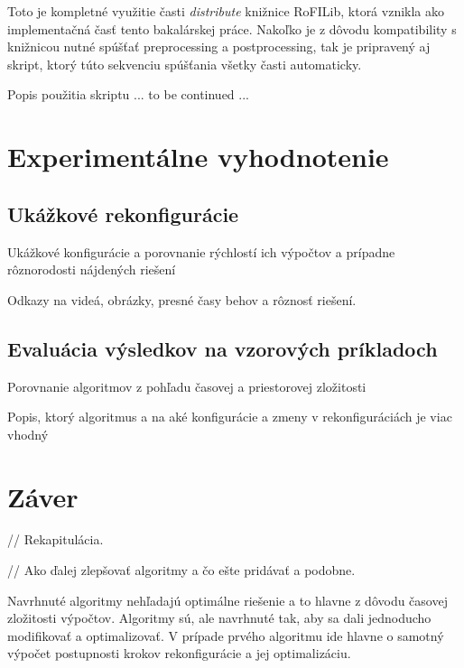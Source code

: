 \documentclass[
  digital, %
  oneside, %
  table,   %
  lof,     %
  nolot,     %
]{fithesis3}
\begin{document}
Toto je kompletné využitie časti \textit{distribute} knižnice RoFILib, ktorá vznikla ako implementačná časť tento bakalárskej práce. Nakoľko je z dôvodu kompatibility s knižnicou nutné spúšťať preprocessing a postprocessing, tak je pripravený aj skript, ktorý túto sekvenciu spúšťania všetky časti automaticky. 

Popis použitia skriptu ... to be continued ...










\chapter{Experimentálne vyhodnotenie}
\section{Ukážkové rekonfigurácie}
Ukážkové konfigurácie a porovnanie rýchlostí ich výpočtov a prípadne rôznorodosti nájdených riešení

Odkazy na videá, obrázky, presné časy behov a rôznosť riešení. 
\section{Evaluácia výsledkov na vzorových príkladoch}
Porovnanie algoritmov z pohľadu časovej a priestorovej zložitosti

Popis, ktorý algoritmus a na aké konfigurácie a zmeny v rekonfiguráciách je viac vhodný






\chapter{Záver}
\label{sec:future}
// Rekapitulácia. 

// Ako ďalej zlepšovať algoritmy a čo ešte pridávať a podobne. 

Navrhnuté algoritmy nehľadajú optimálne riešenie a to hlavne z dôvodu časovej zložitosti výpočtov. Algoritmy sú, ale navrhnuté tak, aby sa dali jednoducho modifikovať a optimalizovať. V prípade prvého algoritmu ide hlavne o samotný výpočet postupnosti krokov rekonfigurácie a jej optimalizáciu. 
\end{document}
